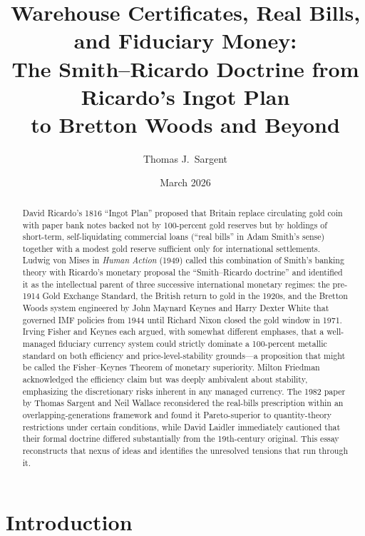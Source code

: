 \documentclass[12pt]{article}
\title{\textbf{Warehouse Certificates, Real Bills, and Fiduciary Money:\\
The Smith--Ricardo Doctrine from Ricardo's Ingot Plan\\
to Bretton Woods and Beyond}}
\author{Thomas J.\ Sargent}
\date{March 2026}
\begin{document}
\maketitle

\begin{abstract}
\noindent
David Ricardo's 1816 ``Ingot Plan'' proposed that Britain replace
circulating gold coin with paper bank notes backed not by 100-percent gold
reserves but by holdings of short-term, self-liquidating commercial loans
(``real bills'' in Adam Smith's sense) together with a modest gold reserve
sufficient only for international settlements.  Ludwig von Mises in
\textit{Human Action} (1949) called this combination of Smith's banking
theory with Ricardo's monetary proposal the ``Smith--Ricardo doctrine''
and identified it as the intellectual parent of three successive
international monetary regimes: the pre-1914 Gold Exchange Standard, the
British return to gold in the 1920s, and the Bretton Woods system
engineered by John Maynard Keynes and Harry Dexter White that governed IMF
policies from 1944 until Richard Nixon closed the gold window in 1971.
Irving Fisher and Keynes each argued, with somewhat different emphases,
that a well-managed fiduciary currency system could strictly dominate a
100-percent metallic standard on both efficiency and price-level-stability
grounds---a proposition that might be called the Fisher--Keynes Theorem of
monetary superiority.  Milton Friedman acknowledged the efficiency claim
but was deeply ambivalent about stability, emphasizing the discretionary
risks inherent in any managed currency.  The 1982 paper by Thomas Sargent
and Neil Wallace reconsidered the real-bills prescription within an
overlapping-generations framework and found it Pareto-superior to
quantity-theory restrictions under certain conditions, while David Laidler
immediately cautioned that their formal doctrine differed substantially
from the 19th-century original.  This essay reconstructs that nexus of
ideas and identifies the unresolved tensions that run through it.
\end{abstract}

\tableofcontents
\newpage

\section{Introduction}
\label{sec:intro}
\end{document}
